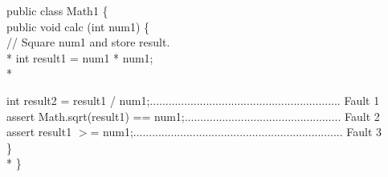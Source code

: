 \documentclass[conference]{IEEEtran}
\begin{document}
\noindent public class Math1 \{\\
\indent public void calc (int num1) \{\\

\indent // Square num1 and store result.\\*
\indent int result1 = num1 * num1;\\*

\indent int result2 = result1 / num1;............................................................. Fault 1\\

\indent assert Math.sqrt(result1) == num1;.................................................. Fault 2\\

\indent assert result1 $>$= num1;................................................................... Fault 3\\
\indent \}  \\*
\noindent\}\\
\end{document}
